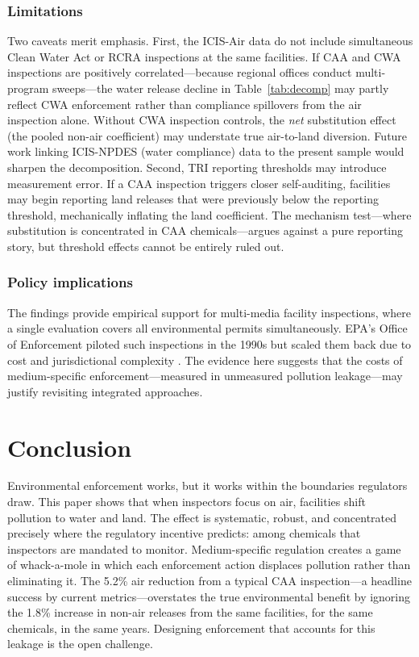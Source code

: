 \documentclass[12pt]{article}
\begin{document}
\subsubsection*{Limitations} Two caveats merit emphasis. First, the ICIS-Air data do not include simultaneous Clean Water Act or RCRA inspections at the same facilities. If CAA and CWA inspections are positively correlated---because regional offices conduct multi-program sweeps---the water release decline in Table~\ref{tab:decomp} may partly reflect CWA enforcement rather than compliance spillovers from the air inspection alone. Without CWA inspection controls, the \textit{net} substitution effect (the pooled non-air coefficient) may understate true air-to-land diversion. Future work linking ICIS-NPDES (water compliance) data to the present sample would sharpen the decomposition. Second, TRI reporting thresholds may introduce measurement error. If a CAA inspection triggers closer self-auditing, facilities may begin reporting land releases that were previously below the reporting threshold, mechanically inflating the land coefficient. The mechanism test---where substitution is concentrated in CAA chemicals---argues against a pure reporting story, but threshold effects cannot be entirely ruled out.

\subsubsection*{Policy implications} The findings provide empirical support for multi-media facility inspections, where a single evaluation covers all environmental permits simultaneously. EPA's Office of Enforcement piloted such inspections in the 1990s but scaled them back due to cost and jurisdictional complexity \citep{sigman2001crossmedia}. The evidence here suggests that the costs of medium-specific enforcement---measured in unmeasured pollution leakage---may justify revisiting integrated approaches.


\section{Conclusion}

Environmental enforcement works, but it works within the boundaries regulators draw. This paper shows that when inspectors focus on air, facilities shift pollution to water and land. The effect is systematic, robust, and concentrated precisely where the regulatory incentive predicts: among chemicals that inspectors are mandated to monitor. Medium-specific regulation creates a game of whack-a-mole in which each enforcement action displaces pollution rather than eliminating it. The 5.2\% air reduction from a typical CAA inspection---a headline success by current metrics---overstates the true environmental benefit by ignoring the 1.8\% increase in non-air releases from the same facilities, for the same chemicals, in the same years. Designing enforcement that accounts for this leakage is the open challenge.
\end{document}
